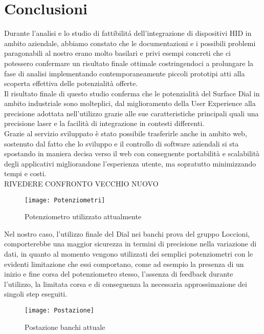 \chapter{Conclusioni}
\label{chap: Conclusioni}

Durante l'analisi e lo studio di fattibilitá dell'integrazione di dispositivi HID in ambito aziendale, abbiamo constato che le documentazioni e i possibili problemi paragonabili al nostro erano molto basilari e privi esempi concreti che ci potessero confermare un risultato finale ottimale costringendoci a prolungare la fase di analisi implementando contemporaneamente piccoli prototipi atti alla scoperta effettiva delle potenzialità offerte.\\

Il risultato finale di questo studio conferma che le potenzialità del Surface Dial in ambito industriale sono molteplici, dal miglioramento della User Experience alla precisione adottata nell’utilizzo grazie alle sue caratteristiche principali quali una precisione laser e la facilità di integrazione in contesti differenti.\\

Grazie al servizio sviluppato è stato possibile trasferirle anche in ambito web, sostenuto dal fatto che lo sviluppo e il controllo di software aziendali si sta spostando in maniera decisa verso il web con conseguente portabilità e scalabilità degli applicativi migliorandone l'esperienza utente, ma sopratutto minimizzando tempi e costi.\\


RIVEDERE CONFRONTO VECCHIO NUOVO
\begin{figure}[htpb!]
\center
  \texttt{[image: Potenziometri]}
  \caption{Potenziometro utilizzato attualmente}
\end{figure}

Nel nostro caso, l’utilizzo finale del Dial nei banchi prova del gruppo Loccioni, comporterebbe una maggior sicurezza in termini di precisione nella variazione di dati, in quanto al momento vengono utilizzati dei semplici potenziometri con le evidenti limitazione che essi comportano, come ad esempio la presenza di un inizio e fine corsa del potenziometro stesso, l’assenza di feedback durante l’utilizzo, la limitata corsa e di conseguenza la necessaria approssimazione dei singoli step eseguiti.

\begin{figure}[htpb!]
\center
\texttt{[image: Postazione]}
\caption{Postazione banchi attuale}
\end{figure}

